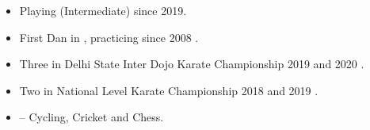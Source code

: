


\begin{itemize}

\item Playing {\color{black}{Guitar}} (Intermediate) since 2019.
\smallskip
\item First Dan {\color{black}{Black Belt}} in {\color{black}{Karate}}, practicing since 2008 \hspace{0.02cm}\href{https://drive.google.com/file/d/1JoKezafJ_j58_FUGwm4_MW-CSWOgB9Iq/view?usp=sharing}{\color{coolblack}{\ExternalLink}}.
\smallskip
\item Three {\color{black}{Gold Medals}} in Delhi State Inter Dojo Karate Championship 2019 and 2020 \hspace{0.02cm}\href{https://drive.google.com/file/d/1Jv4oj5L4ObkZ6nZMxcPOHJBW1GapOsXq/view?usp=sharing}{\color{coolblack}{\ExternalLink}}.
\item Two {\color{black}{Bronze Medals}} in National Level Karate Championship 2018 and 2019 \hspace{0.02cm}\href{https://drive.google.com/file/d/1JwTKwOhlYg8OSZzhLZ06Uf-Zfi4yDrQw/view?usp=sharing}{\color{coolblack}{\ExternalLink}}.
\smallskip
\item {\color{black}{Other Areas of Interest}} -- Cycling, Cricket and Chess.

\end{itemize}